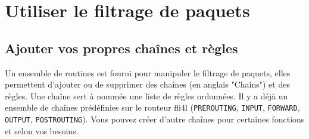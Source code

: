 
\providecommand{\fwaction}[1]{{\small\textsf{#1}}}
\providecommand{\fwchain}[1]{\texttt{#1}}
\providecommand{\fwtable}[1]{\textsc{#1}}
\providecommand{\fwmatch}[1]{\texttt{#1}}
\providecommand{\fwpktstate}[1]{\texttt{#1}}
\providecommand{\fwloglevel}[1]{\texttt{#1}}

\section{Utiliser le filtrage de paquets}

\subsection{Ajouter vos propres chaînes et règles}

Un ensemble de routines est fourni pour manipuler le filtrage de paquets,
elles permettent d'ajouter ou de supprimer des chaînes (en anglais "Chains")
et des règles. Une chaîne sert à nommée une liste de règles ordonnées.
Il y a déjà un ensemble de chaînes prédéfinies sur le routeur fli4l
(\fwchain{PREROUTING}, \fwchain{INPUT}, \fwchain{FORWARD}, \fwchain{OUTPUT},
\fwchain{POSTROUTING}). Vous pouvez créer d'autre chaînes pour certaines
fonctions et selon vos besoins.

